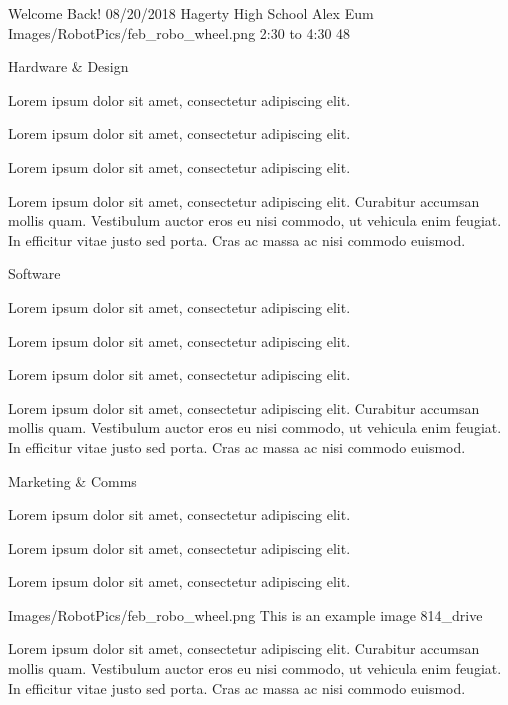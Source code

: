 \insertmeeting 
	{Welcome Back!}
    {08/20/2018}
	{Hagerty High School}
	{Alex Eum}
	{Images/RobotPics/feb_robo_wheel.png}
	{2:30 to 4:30}
    {48}
	
\newsection
	{Hardware \& Design}
	{
		\item Lorem ipsum dolor sit amet, consectetur adipiscing elit. 
		\item Lorem ipsum dolor sit amet, consectetur adipiscing elit. 
		\item Lorem ipsum dolor sit amet, consectetur adipiscing elit.
	}
	{
\lipsum[1-6]
	}
	{Lorem ipsum dolor sit amet, consectetur adipiscing elit. Curabitur accumsan mollis quam. Vestibulum auctor eros eu nisi commodo, ut vehicula enim feugiat. In efficitur vitae justo sed porta. Cras ac massa ac nisi commodo euismod.}

\newsection
	{Software}
	{
		\item Lorem ipsum dolor sit amet, consectetur adipiscing elit. 
		\item Lorem ipsum dolor sit amet, consectetur adipiscing elit. 
		\item Lorem ipsum dolor sit amet, consectetur adipiscing elit.
	}
	{
\lipsum[1-4]
	}
	{Lorem ipsum dolor sit amet, consectetur adipiscing elit. Curabitur accumsan mollis quam. Vestibulum auctor eros eu nisi commodo, ut vehicula enim feugiat. In efficitur vitae justo sed porta. Cras ac massa ac nisi commodo euismod.}

\newsection
	{Marketing \& Comms}
	{
		\item Lorem ipsum dolor sit amet, consectetur adipiscing elit. 
		\item Lorem ipsum dolor sit amet, consectetur adipiscing elit. 
		\item Lorem ipsum dolor sit amet, consectetur adipiscing elit.
	}
	{
\lipsum[1-2]

\insertmeetingimage
	{Images/RobotPics/feb_robo_wheel.png}
	{This is an example image}
	{814_drive}

\lipsum[1-2]
	}
	{Lorem ipsum dolor sit amet, consectetur adipiscing elit. Curabitur accumsan mollis quam. Vestibulum auctor eros eu nisi commodo, ut vehicula enim feugiat. In efficitur vitae justo sed porta. Cras ac massa ac nisi commodo euismod.}

